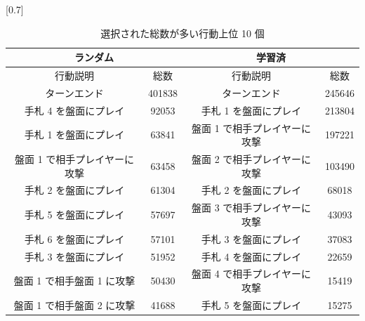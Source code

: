 \documentclass[12pt]{jarticle}
\begin{document}
  \begin{table}[t]
    \centering
    \caption{選択された総数が多い行動上位 10 個}
    \vspace{-0.3cm}
    \label{table:actioncount}
    \scalebox{0.7}[0.7]{
      \begin{tabular}{|cc|cc|}
        \hline
        \multicolumn{2}{|c|}{ランダム}      & \multicolumn{2}{c|}{学習済}       \\ \hline
        \multicolumn{1}{|c|}{行動説明} & 総数 & \multicolumn{1}{c|}{行動説明} & 総数 \\ \hline \hline
        \multicolumn{1}{|c|}{ターンエンド}    & 401838  & \multicolumn{1}{c|}{ターンエンド}    & 245646  \\ \hline
        \multicolumn{1}{|c|}{手札 4 を盤面にプレイ}    &  92053  & \multicolumn{1}{c|}{手札 1 を盤面にプレイ}    & 213804  \\ \hline
        \multicolumn{1}{|c|}{手札 1 を盤面にプレイ}    & 63841  & \multicolumn{1}{c|}{盤面 1 で相手プレイヤーに攻撃}    & 197221  \\ \hline
        \multicolumn{1}{|c|}{盤面 1 で相手プレイヤーに攻撃}    & 63458  & \multicolumn{1}{c|}{盤面 2 で相手プレイヤーに攻撃}    & 103490  \\ \hline
        \multicolumn{1}{|c|}{手札 2 を盤面にプレイ}    & 61304  & \multicolumn{1}{c|}{手札 2 を盤面にプレイ}    & 68018  \\ \hline
        \multicolumn{1}{|c|}{手札 5 を盤面にプレイ}    & 57697  & \multicolumn{1}{c|}{盤面 3 で相手プレイヤーに攻撃}    & 43093  \\ \hline
        \multicolumn{1}{|c|}{手札 6 を盤面にプレイ}    & 57101  & \multicolumn{1}{c|}{手札 3 を盤面にプレイ}    & 37083  \\ \hline
        \multicolumn{1}{|c|}{手札 3 を盤面にプレイ}    & 51952  & \multicolumn{1}{c|}{手札 4 を盤面にプレイ}    & 22659  \\ \hline
        \multicolumn{1}{|c|}{盤面 1 で相手盤面 1 に攻撃}    & 50430  & \multicolumn{1}{c|}{盤面 4 で相手プレイヤーに攻撃}    & 15419  \\ \hline
     
        \multicolumn{1}{|c|}{盤面 1 で相手盤面 2 に攻撃}    & 41688  & \multicolumn{1}{c|}{手札 5 を盤面にプレイ}    & 15275  \\ \hline
        \end{tabular}
    }
  \end{table}
\end{document}
